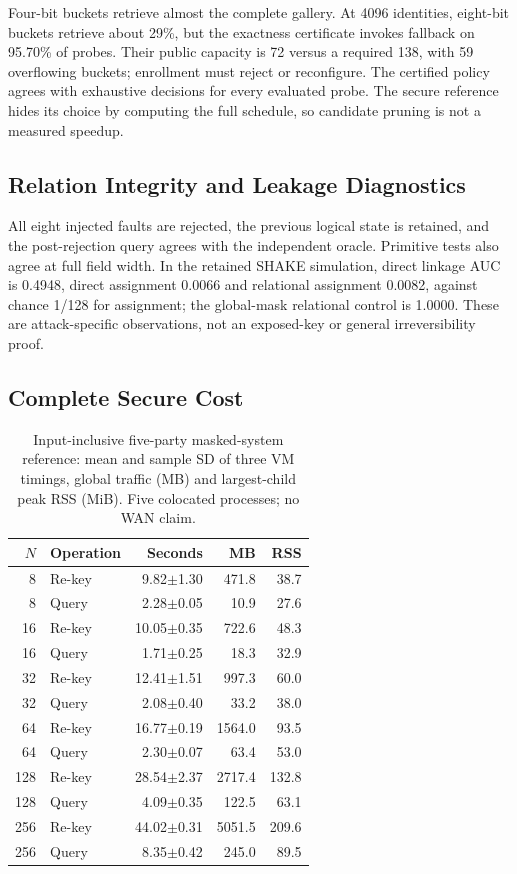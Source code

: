 Four-bit buckets retrieve almost the complete gallery. At 4096 identities, eight-bit buckets retrieve about 29\%, but the exactness certificate invokes fallback on 95.70\% of probes. Their public capacity is 72 versus a required 138, with 59 overflowing buckets; enrollment must reject or reconfigure. The certified policy agrees with exhaustive decisions for every evaluated probe. The secure reference hides its choice by computing the full schedule, so candidate pruning is not a measured speedup.

\subsection{Relation Integrity and Leakage Diagnostics}

All eight injected faults are rejected, the previous logical state is retained, and the post-rejection query agrees with the independent oracle. Primitive tests also agree at full field width. In the retained SHAKE simulation, direct linkage AUC is 0.4948, direct assignment 0.0066 and relational assignment 0.0082, against chance 1/128 for assignment; the global-mask relational control is 1.0000. These are attack-specific observations, not an exposed-key or general irreversibility proof.

\subsection{Complete Secure Cost}

\begin{table}[t]
\caption{Input-inclusive five-party masked-system reference: mean and sample SD of three VM timings, global traffic (MB) and largest-child peak RSS (MiB). Five colocated processes; no WAN claim.}
\label{tab:secure}\centering\small
\setlength{\tabcolsep}{3pt}
\begin{tabular}{rlrrr}
\toprule
$N$ & Operation & Seconds & MB & RSS \\
\midrule
8 & Re-key & 9.82$\pm$1.30 & 471.8 & 38.7 \\
8 & Query & 2.28$\pm$0.05 & 10.9 & 27.6 \\
16 & Re-key & 10.05$\pm$0.35 & 722.6 & 48.3 \\
16 & Query & 1.71$\pm$0.25 & 18.3 & 32.9 \\
32 & Re-key & 12.41$\pm$1.51 & 997.3 & 60.0 \\
32 & Query & 2.08$\pm$0.40 & 33.2 & 38.0 \\
64 & Re-key & 16.77$\pm$0.19 & 1564.0 & 93.5 \\
64 & Query & 2.30$\pm$0.07 & 63.4 & 53.0 \\
128 & Re-key & 28.54$\pm$2.37 & 2717.4 & 132.8 \\
128 & Query & 4.09$\pm$0.35 & 122.5 & 63.1 \\
256 & Re-key & 44.02$\pm$0.31 & 5051.5 & 209.6 \\
256 & Query & 8.35$\pm$0.42 & 245.0 & 89.5 \\
\bottomrule
\end{tabular}
\end{table}

